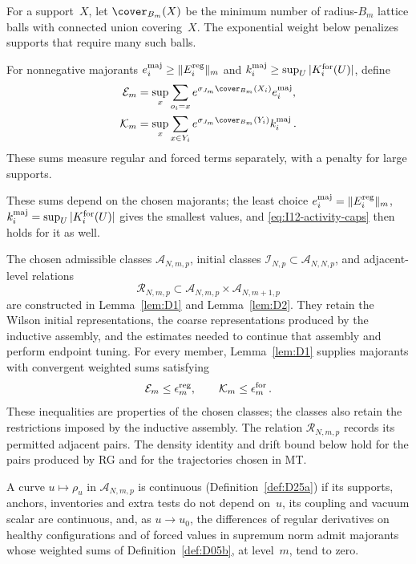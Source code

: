 For a support~$X$, let $\cover_{B_m}(X)$ be the minimum number of radius-$B_m$ lattice balls with connected union covering~$X$. The exponential weight below penalizes supports that require many such balls.

\begin{definition}\label{def:D05b}
For nonnegative majorants $e_i^{\rm maj}\ge\|E_i^{\rm reg}\|_m$ and $k_i^{\rm maj}\ge\sup_U|K_i^{\rm for}(U)|$, define
\begin{align*}
\mathcal E_m&=\sup_x\sum_{o_i=x}e^{\sigma_{J_m}\cover_{B_m}(X_i)}e_i^{\rm maj},\\
\mathcal K_m&=\sup_x\sum_{x\in Y_i}e^{\sigma_{J_m}\cover_{B_m}(Y_i)}k_i^{\rm maj}\,.
\end{align*}
These sums measure regular and forced terms separately, with a penalty for large supports.
\end{definition}

These sums depend on the chosen majorants; the least choice $e_i^{\rm maj}=\|E_i^{\rm reg}\|_m$, $k_i^{\rm maj}=\sup_U|K_i^{\rm for}(U)|$ gives the smallest values, and \eqref{eq:I12-activity-caps} then holds for it as well.

The chosen admissible classes $\mathcal A_{N,m,p}$, initial classes $\mathcal I_{N,p}\subset\mathcal A_{N,N,p}$, and adjacent-level relations
\begin{equation*}
\mathcal R_{N,m,p}\subset\mathcal A_{N,m,p}\times\mathcal A_{N,m+1,p}
\end{equation*}
are constructed in Lemma~\ref{lem:D1} and Lemma~\ref{lem:D2}. They retain the Wilson initial representations, the coarse representations produced by the inductive assembly, and the estimates needed to continue that assembly and perform endpoint tuning. For every member, Lemma~\ref{lem:D1} supplies majorants with convergent weighted sums satisfying
\begin{equation}\label{eq:I12-activity-caps}
\mathcal E_m\le\epsilon_m^{\rm reg},\qquad \mathcal K_m\le\epsilon_m^{\rm for}\,.
\end{equation}
These inequalities are properties of the chosen classes; the classes also retain the restrictions imposed by the inductive assembly. The relation $\mathcal R_{N,m,p}$ records its permitted adjacent pairs. The density identity and drift bound below hold for the pairs produced by RG and for the trajectories chosen in MT.

A curve $u\mapsto\rho_u$ in $\mathcal A_{N,m,p}$ is continuous (Definition~\ref{def:D25a}) if its supports, anchors, inventories and extra tests do not depend on~$u$, its coupling and vacuum scalar are continuous, and, as $u\to u_0$, the differences of regular derivatives on healthy configurations and of forced values in supremum norm admit majorants whose weighted sums of Definition~\ref{def:D05b}, at level~$m$, tend to zero.

